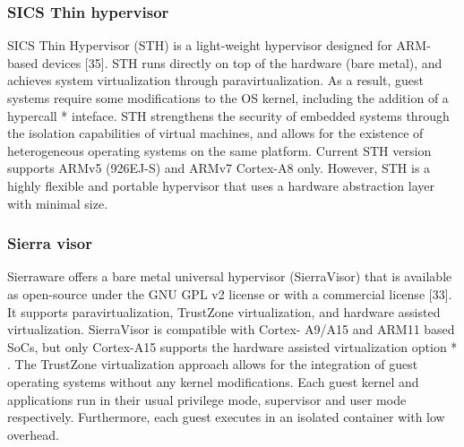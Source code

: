 \subsubsection{SICS Thin hypervisor}
SICS Thin Hypervisor (STH) is a light-weight hypervisor designed for ARM-
based devices [35]. STH runs directly on top of the hardware (bare metal),
and achieves system virtualization through paravirtualization. As a result,
guest systems require some modifications to the OS kernel, including the
addition of a hypercall * inteface. STH strengthens the security of embedded
systems through the isolation capabilities of virtual machines, and allows
for the existence of heterogeneous operating systems on the same platform.
Current STH version supports ARMv5 (926EJ-S) and ARMv7 Cortex-A8
only. However, STH is a highly flexible and portable hypervisor that uses a
hardware abstraction layer with minimal size.

\subsubsection{Sierra visor}
Sierraware offers a bare metal universal hypervisor (SierraVisor) that is
available as open-source under the GNU GPL v2 license or with a commercial
license [33]. It supports paravirtualization, TrustZone virtualization, and
hardware assisted virtualization. SierraVisor is compatible with Cortex-
A9/A15 and ARM11 based SoCs, but only Cortex-A15 supports the
hardware assisted virtualization option * . The TrustZone virtualization
approach allows for the integration of guest operating systems without any
kernel modifications. Each guest kernel and applications run in their usual
privilege mode, supervisor and user mode respectively. Furthermore, each
guest executes in an isolated container with low overhead.

